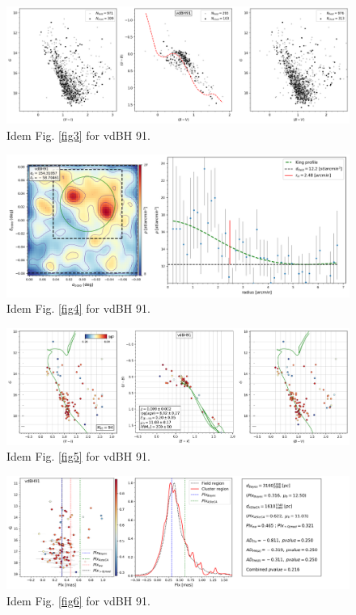 \documentclass[draft]{aa}
\begin{document}
\begin{figure}[ht]
    \centering
    \includegraphics[width=\hsize]{../figs/obs_vdBH91.png}
    \caption{Idem Fig. \ref{fig3} for vdBH 91.}
    \label{fig27}
\end{figure}
\begin{figure}[ht]
    \centering
    \includegraphics[width=\hsize]{../figs/dmap_vdbh91.png}
    \caption{Idem Fig. \ref{fig4} for vdBH 91.}
    \label{fig28}
\end{figure}
\begin{figure}[ht]
    \centering
    \includegraphics[width=\hsize]{../figs/cmds_vdBH91.png}
    \caption{Idem Fig. \ref{fig5} for vdBH 91.}
    \label{fig29}
\end{figure}
\begin{figure}[ht]
    \centering
    \includegraphics[width=\hsize]{../figs/plx_vdBH91.png}
    \caption{Idem Fig. \ref{fig6} for vdBH 91.}
    \label{fig30}
\end{figure}
\end{document}
